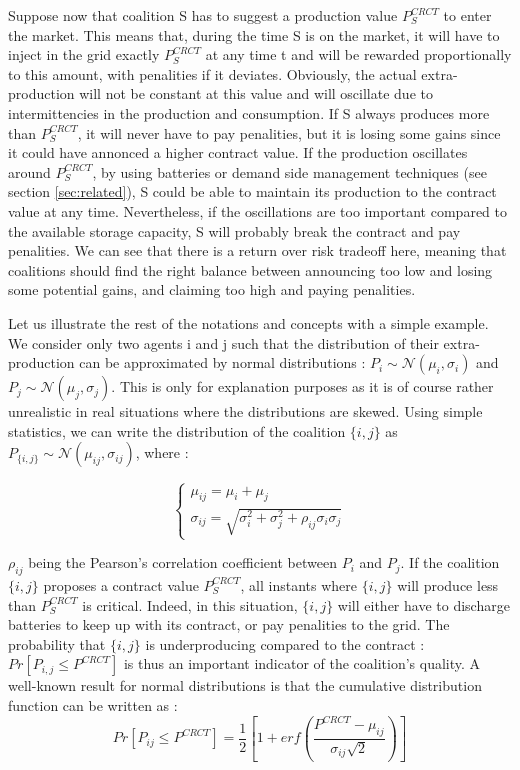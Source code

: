 \documentclass[conference]{IEEEtran}
\begin{document}
Suppose now that coalition S has to suggest a production value $ P_{S}^{CRCT} $ to enter the market. This means that, during the time S is on the market, it will have to inject in the grid exactly $ P_{S}^{CRCT} $ at any time t and will be rewarded proportionally to this amount, with penalities if it deviates. Obviously, the actual extra-production will not be constant at this value and will oscillate due to intermittencies in the production and consumption. If S always produces more than $ P_{S}^{CRCT} $, it will never have to pay penalities, but it is losing some gains since it could have annonced a higher contract value. If the production oscillates around $ P_{S}^{CRCT} $, by using batteries or demand side management techniques (see section \ref{sec:related}), S could be able to maintain its production to the contract value at any time. Nevertheless, if the oscillations are too important compared to the available storage capacity, S will probably break the contract and pay penalities. We can see that there is a return over risk tradeoff here, meaning that coalitions should find the right balance between announcing too low and losing some potential gains, and claiming too high and paying penalities. 

Let us illustrate the rest of the notations and concepts with a simple example. We consider only two agents i and j such that the distribution of their extra-production can be approximated by normal distributions : $ P_{i} \sim \mathcal{N}(\mu_{i}, \sigma_{i} ) $ and $ P_{j} \sim \mathcal{N}(\mu_{j}, \sigma_{j} ) $. This is only for explanation purposes as it is of course rather unrealistic in real situations where the distributions are skewed. Using simple statistics, we can write the distribution of the coalition $ \{i,j\} $ as $ P_{\{i,j\}} \sim \mathcal{N}(\mu_{ij}, \sigma_{ij}) $, where :

\begin{equation}
\left\{ \begin{array}{lll}
		\mu_{ij} = \mu_{i} + \mu_{j} \\
		\sigma_{ij} = \sqrt{\sigma_{i}^{2} + \sigma_{j}^{2} + \rho_{ij} \sigma_{i} \sigma_{j} }
\end{array} \right.
\end{equation}

$ \rho_{ij} $ being the Pearson's correlation coefficient between $ P_{i} $ and $ P_{j} $. If the coalition $ \{i,j\}$ proposes a contract value $ P_{S}^{CRCT} $, all instants where $ \{i,j\}$ will produce less than $ P_{S}^{CRCT} $ is critical. Indeed, in this situation, $ \{i,j\}$ will either have to discharge batteries to keep up with its contract, or pay penalities to the grid. The probability that $ \{i,j\}$ is underproducing compared to the contract : $ Pr[P_{i,j} \leq P^{CRCT}] $ is thus an important indicator of the coalition's quality. A well-known result for normal distributions is that the cumulative distribution function can be written as :
\begin{equation}
Pr[P_{ij} \leq P^{CRCT}] = \dfrac{1}{2} \left[ 1+ erf \left( \dfrac{P^{CRCT} - \mu_{ij}}{\sigma_{ij}\sqrt{2}} \right) \right] 
\end{equation}
 
\end{document}
